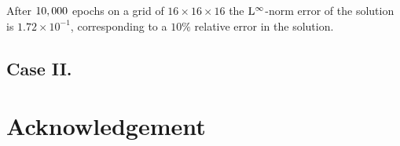 \documentclass{elsarticle}
\begin{document}
After $\rm 10,000$ epochs on a grid of $16\times 16 \times 16$ the $\rm L^\infty$-norm error of the solution is $1.72\times 10^{-1}$, corresponding to a $10\%$ relative error in the solution.




\subsection{Case II.}










\section*{Acknowledgement}



\newpage


\end{document}

